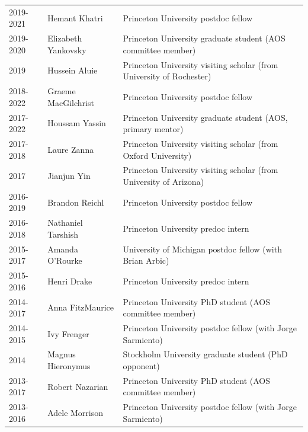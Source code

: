 \documentclass{article}
\begin{document}
\begin{tabular}{lll}
2019-2021 & Hemant Khatri & Princeton University postdoc fellow  \\ 

2019-2020 & Elizabeth Yankovsky & Princeton University graduate student (AOS committee member) \\ 

2019     & Hussein Aluie & Princeton University visiting scholar (from University of Rochester)  \\ 

2018-2022 & Graeme MacGilchrist & Princeton University postdoc fellow \\ 

2017-2022 & Houssam Yassin & Princeton University graduate student (AOS, primary mentor) \\ 

2017-2018 & Laure Zanna  & Princeton University visiting scholar (from Oxford University)  \\

2017 & Jianjun Yin       & Princeton University visiting scholar (from University of Arizona)  \\

2016-2019 & Brandon Reichl       & Princeton University postdoc fellow  \\

2016-2018 & Nathaniel Tarshish & Princeton University predoc intern \\

2015-2017 & Amanda O'Rourke  & University of Michigan postdoc fellow (with Brian Arbic) \\

2015-2016    & Henri Drake             & Princeton University predoc intern \\

2014-2017 & Anna FitzMaurice   & Princeton University PhD student (AOS committee member) \\ 

2014-2015     & Ivy Frenger            & Princeton University postdoc fellow (with Jorge Sarmiento) \\

2014 & Magnus Hieronymus& Stockholm University graduate student (PhD opponent) \\ 

2013-2017 & Robert Nazarian    & Princeton University PhD student (AOS committee member) \\ 

2013-2016     & Adele Morrison     & Princeton University postdoc fellow (with Jorge Sarmiento) \\


\end{tabular}
\end{document}
